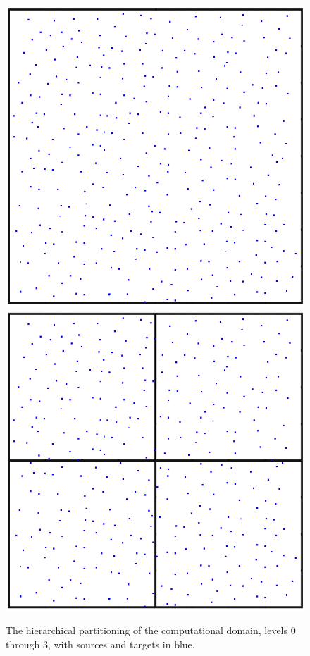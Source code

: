 \documentclass[11pt, oneside]{article}   	%
\begin{document}
\begin{figure}[h]
\caption{The hierarchical partitioning of the computational domain, levels $0$ through $3$, with sources and targets in blue.}
\label{fig:4}
\centering
\includegraphics[scale=0.25]{./images/b0}
\includegraphics[scale=0.25]{./images/b1}

\end{figure}
\end{document}

